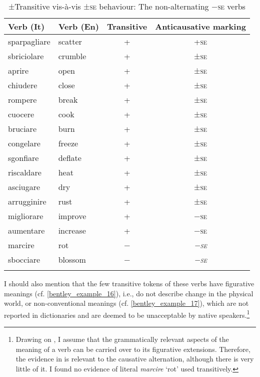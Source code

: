 \documentclass[output=paper,colorlinks,citecolor=brown
]{langscibook}
\begin{document}
\begin{table}
\caption{±Transitive vis-à-vis ±\textsc{se} behaviour: The non-alternating −\textsc{se} verbs}
\label{tab:bentley_table_4}\begin{tabular}{llcc}
\lsptoprule
Verb (It)    & Verb (En) & Transitive & Anticausative marking \\
\midrule
sparpagliare & scatter   & +          & +\textsc{se}                  \\
sbriciolare  & crumble   & +          & ±\textsc{se}                  \\
aprire       & open      & +          & ±\textsc{se}                  \\
chiudere     & close     & +          & ±\textsc{se}                  \\
rompere      & break     & +          & ±\textsc{se}                  \\
cuocere      & cook      & +          & ±\textsc{se}                  \\
bruciare     & burn      & +          & ±\textsc{se}                  \\
congelare    & freeze    & +          & ±\textsc{se}                  \\
sgonfiare    & deflate   & +          & ±\textsc{se}                  \\
riscaldare   & heat      & +          & ±\textsc{se}                  \\
asciugare    & dry       & +          & ±\textsc{se}                  \\
arrugginire  & rust      & +          & ±\textsc{se}                  \\
migliorare   & improve   & +          & −\textsc{se}                  \\
aumentare    & increase  & +          & −\textsc{se}                  \\
\cellcolor[HTML]{BFBFBF}marcire      &\cellcolor[HTML]{BFBFBF} rot       & \cellcolor[HTML]{BFBFBF}−          & \cellcolor[HTML]{BFBFBF}\textit{−\textsc{se}}          \\
\cellcolor[HTML]{BFBFBF}sbocciare    & \cellcolor[HTML]{BFBFBF}blossom   & \cellcolor[HTML]{BFBFBF}−          & \cellcolor[HTML]{BFBFBF}\textit{−\textsc{se}}           \\
\lspbottomrule
\end{tabular}
\end{table}

I should also mention that the few transitive tokens of these verbs have figurative meanings (cf. \ref{bentley_example_16}), i.e., do not describe change in the physical world, or non-conventional meanings (cf. \ref{bentley_example_17}), which are not reported in dictionaries and are deemed to be unacceptable by native speakers.\footnote{Drawing on \citet{mcnally2022grammatically}, I assume that the grammatically relevant aspects of the meaning of a verb can be carried over to its figurative extensions. Therefore, the evidence in  is relevant to the causative alternation, although there is very little of it. I found no evidence of literal \textit{marcire} ‘rot’ used transitively.}
\end{document}
